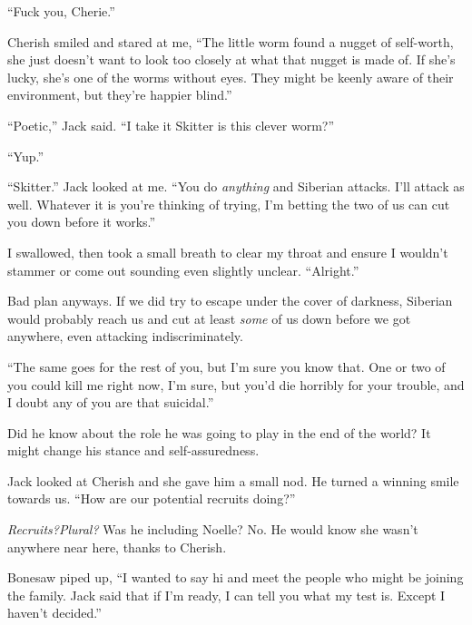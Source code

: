 ``Fuck you, Cherie.''



Cherish smiled and stared at me, ``The little worm found a nugget of self-worth, she just doesn't want to look too closely at what that nugget is made of.  If she's lucky, she's one of the worms without eyes.  They might be keenly aware of their environment, but they're happier blind.''



``Poetic,'' Jack said.  ``I take it Skitter is this clever worm?''



``Yup.''



``Skitter.'' Jack looked at me.  ``You do \emph{anything} and Siberian attacks.  I'll attack as well.  Whatever it is you're thinking of trying, I'm betting the two of us can cut you down before it works.''



I swallowed, then took a small breath to clear my throat and ensure I wouldn't stammer or come out sounding even slightly unclear.  ``Alright.''



Bad plan anyways.  If we did try to escape under the cover of darkness, Siberian would probably reach us and cut at least \emph{some} of us down before we got anywhere, even attacking indiscriminately.



``The same goes for the rest of you, but I'm sure you know that.  One or two of you could kill me right now, I'm sure, but you'd die horribly for your trouble, and I doubt any of you are that suicidal.''



Did he know about the role he was going to play in the end of the world?  It might change his stance and self-assuredness.



Jack looked at Cherish and she gave him a small nod.  He turned a winning smile towards us.  ``How are our potential recruits doing?''



\emph{Recruits?}\emph{Plural?}  Was he including Noelle?  No.  He would know she wasn't anywhere near here, thanks to Cherish.



Bonesaw piped up, ``I wanted to say hi and meet the people who might be joining the family.  Jack said that if I'm ready, I can tell you what my test is.  Except I haven't decided.''



